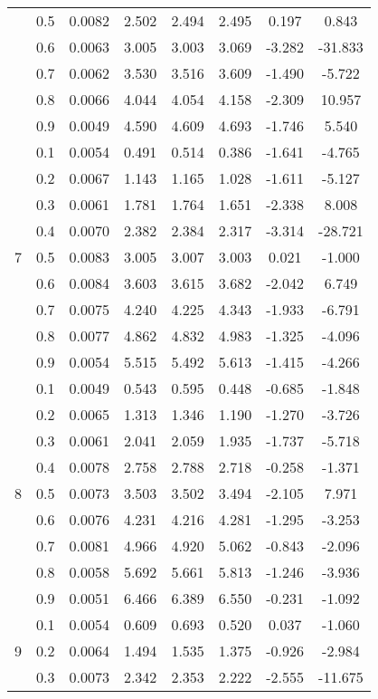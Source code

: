 \documentclass[11pt,a4paper]{report}
\begin{document}
\begin{longtable}{ | c | c || c | c | c | c | c | c | }
 & 0.5 & 0.0082 & 2.502 & 2.494 & 2.495 & 0.197 & 0.843 \\
 & 0.6 & 0.0063 & 3.005 & 3.003 & 3.069 & -3.282 & -31.833 \\
 & 0.7 & 0.0062 & 3.530 & 3.516 & 3.609 & -1.490 & -5.722 \\
 & 0.8 & 0.0066 & 4.044 & 4.054 & 4.158 & -2.309 & 10.957 \\
 & 0.9 & 0.0049 & 4.590 & 4.609 & 4.693 & -1.746 & 5.540 \\
 \hline
\multirow{9}{*}{7} & 0.1 & 0.0054 & 0.491 & 0.514 & 0.386 & -1.641 & -4.765 \\
 & 0.2 & 0.0067 & 1.143 & 1.165 & 1.028 & -1.611 & -5.127 \\
 & 0.3 & 0.0061 & 1.781 & 1.764 & 1.651 & -2.338 & 8.008 \\
 & 0.4 & 0.0070 & 2.382 & 2.384 & 2.317 & -3.314 & -28.721 \\
 & 0.5 & 0.0083 & 3.005 & 3.007 & 3.003 & 0.021 & -1.000 \\
 & 0.6 & 0.0084 & 3.603 & 3.615 & 3.682 & -2.042 & 6.749 \\
 & 0.7 & 0.0075 & 4.240 & 4.225 & 4.343 & -1.933 & -6.791 \\
 & 0.8 & 0.0077 & 4.862 & 4.832 & 4.983 & -1.325 & -4.096 \\
 & 0.9 & 0.0054 & 5.515 & 5.492 & 5.613 & -1.415 & -4.266 \\
 \hline
\multirow{9}{*}{8} & 0.1 & 0.0049 & 0.543 & 0.595 & 0.448 & -0.685 & -1.848 \\
 & 0.2 & 0.0065 & 1.313 & 1.346 & 1.190 & -1.270 & -3.726 \\
 & 0.3 & 0.0061 & 2.041 & 2.059 & 1.935 & -1.737 & -5.718 \\
 & 0.4 & 0.0078 & 2.758 & 2.788 & 2.718 & -0.258 & -1.371 \\
 & 0.5 & 0.0073 & 3.503 & 3.502 & 3.494 & -2.105 & 7.971 \\
 & 0.6 & 0.0076 & 4.231 & 4.216 & 4.281 & -1.295 & -3.253 \\
 & 0.7 & 0.0081 & 4.966 & 4.920 & 5.062 & -0.843 & -2.096 \\
 & 0.8 & 0.0058 & 5.692 & 5.661 & 5.813 & -1.246 & -3.936 \\
 & 0.9 & 0.0051 & 6.466 & 6.389 & 6.550 & -0.231 & -1.092 \\
 \hline
\multirow{9}{*}{9} & 0.1 & 0.0054 & 0.609 & 0.693 & 0.520 & 0.037 & -1.060 \\
 & 0.2 & 0.0064 & 1.494 & 1.535 & 1.375 & -0.926 & -2.984 \\
 & 0.3 & 0.0073 & 2.342 & 2.353 & 2.222 & -2.555 & -11.675 \\

\end{longtable}
\end{document}
